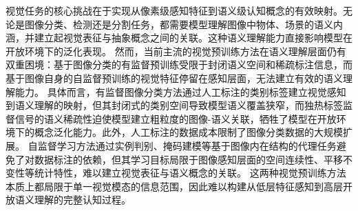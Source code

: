视觉任务的核心挑战在于实现从像素级感知特征到语义级认知概念的有效映射。无论是图像分类、检测还是分割任务，都需要模型理解图像中物体、场景的语义内涵，并建立起视觉表征与抽象概念之间的关联。这种语义理解能力直接影响模型在开放环境下的泛化表现。
然而，当前主流的视觉预训练方法在语义理解层面仍有双重困境：基于图像分类的有监督预训练受限于封闭语义空间和稀疏标注信息，而基于图像自身的自监督预训练的视觉特征停留在感知层面，无法建立有效的语义理解能力。
具体而言，有监督图像分类方法通过人工标注的类别标签建立视觉感知到语义理解的映射，但其封闭式的类别空间导致模型语义覆盖狭窄，而独热标签监督信号的语义稀疏性迫使模型建立粗粒度的图像-语义关联，牺牲了模型在开放环境下的概念泛化能力。此外，人工标注的数据成本限制了图像分类数据的大规模扩展。
自监督学习方法通过实例判别、掩码建模等基于图像内在结构的代理任务避免了对数据标注的依赖，但其学习目标局限于图像感知层面的空间连续性、平移不变性等统计特性，难以建立视觉表征与语义概念的关联。
这两种视觉预训练方法本质上都局限于单一视觉模态的信息范围，因此难以构建从低层特征感知到高层开放语义理解的完整认知过程。

